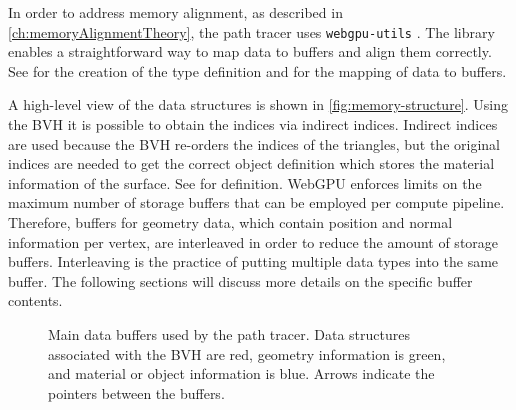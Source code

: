In order to address memory alignment, as described in \autoref{ch:memoryAlignmentTheory}, the path tracer uses \texttt{webgpu-utils} \cite{webgpuUtilsLib}. The library enables a straightforward way to map data to buffers and align them correctly. See  for the creation of the type definition and  for the mapping of data to buffers.

A high-level view of the data structures is shown in \autoref{fig:memory-structure}. Using the \gls{BVH} it is possible to obtain the indices via indirect indices. Indirect indices are used because the \gls{BVH} re-orders the indices of the triangles, but the original indices are needed to get the correct object definition which stores the material information of the surface. See  for definition. \gls{WebGPU} enforces limits on the maximum number of storage buffers that can be employed per compute pipeline. Therefore, buffers for geometry data, which contain position and normal information per vertex, are interleaved in order to reduce the amount of storage buffers. Interleaving is the practice of putting multiple data types into the same buffer. The following sections will discuss more details on the specific buffer contents.

\begin{figure}[H]
    \centering
    \caption{Main data buffers used by the path tracer. Data structures associated with the \gls{BVH} are red, geometry information is green, and material or object information is blue. Arrows indicate the pointers between the buffers.}
    \label{fig:memory-structure}
  \end{figure}

